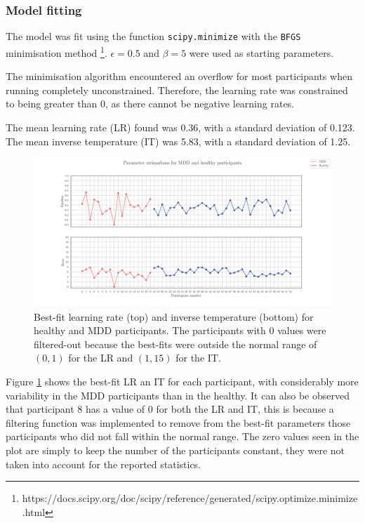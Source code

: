 \documentclass[12pt]{article}
\begin{document}
\subsubsection{Model fitting}
\label{sec:fit-model-0}

The model was fit using the function \texttt{scipy.minimize} with the \texttt{BFGS} minimisation method \footnote{https://docs.scipy.org/doc/scipy/reference/generated/scipy.optimize.minimize.html}. $\epsilon = 0.5$ and $\beta = 5$ were used as starting parameters.

The minimisation algorithm encountered an overflow for most participants when running completely unconstrained. Therefore, the learning rate was constrained to being greater than 0, as there cannot be negative learning rates.

The mean learning rate (LR) found was 0.36, with a standard deviation of 0.123. The mean inverse temperature (IT) was 5.83, with a standard deviation of 1.25. 

\begin{figure}[h!]
	\centering
	\hspace*{-0.6in}
	\includegraphics[width=1.1\linewidth]{figures/2.4.pdf}
	\caption{Best-fit learning rate (top) and inverse temperature (bottom) for healthy and MDD participants. The participants with 0 values were filtered-out because the best-fits were outside the normal range of $(0,1)$ for the LR and $(1, 15)$ for the IT.}
	\label{fig:2.4}
\end{figure}

Figure \ref{fig:2.4} shows the best-fit LR an IT for each participant, with considerably more variability in the MDD participants than in the healthy. It can also be observed that participant 8 has a value of 0 for both the LR and IT, this is because a filtering function was implemented to remove from the best-fit parameters those participants who did not fall within the normal range. The zero values seen in the plot are simply to keep the number of the participants constant, they were not taken into account for the reported statistics. 
\end{document}
